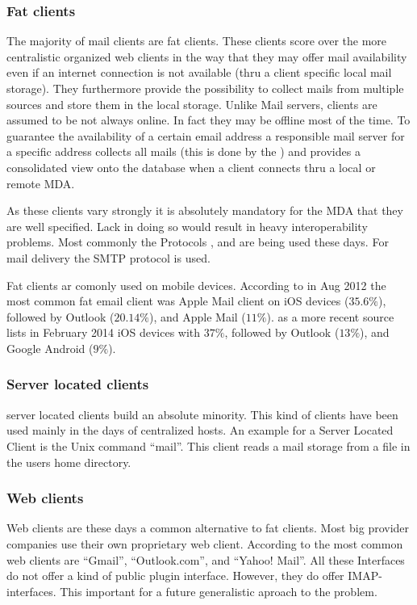 \subsubsection{Fat clients}
The majority of mail clients are fat clients. These clients score over the more centralistic organized web clients in the way that they may offer mail availability even if an internet connection is not available (thru a client specific local mail storage). They furthermore provide the possibility to collect mails from multiple sources and store them in the local storage. Unlike Mail servers, clients are assumed to be not always online. In fact they may be offline most of the time. To guarantee the availability of a certain email address a responsible mail server for a specific address collects all mails (this is done by the ) and provides a consolidated view onto the database when a client connects thru a local or remote MDA.\par

As these clients vary strongly it is absolutely mandatory for the MDA that they are well specified. Lack in doing so would result in heavy interoperability problems. Most commonly the Protocols ,  and  are being used these days. For mail delivery the SMTP protocol is used. \par

Fat clients ar comonly used on mobile devices. According to  \cite{clientDistribution} in Aug 2012 the most common fat email client was Apple Mail client on iOS devices ($35.6\%$), followed by Outlook ($20.14\%$), and Apple Mail ($11\%$). \cite{clientDistribution2} as a more recent source lists in February 2014 iOS devices with $37\%$, followed by Outlook ($13\%$), and  Google Android ($9\%$).

\subsubsection{Server located clients}
server located clients build an absolute minority. This kind of clients have been used mainly in the days of centralized hosts. An example for a Server Located Client is the Unix command "`mail"'. This client reads a mail storage from a file in the users home directory.

\subsubsection{Web clients}
Web clients are these days a common alternative to fat clients. Most big provider companies use their own proprietary web client. According to \cite{clientDistribution2} the most common web clients are "`Gmail"', "`Outlook.com"', and "`Yahoo! Mail"'. All these Interfaces do not offer a kind of public plugin interface. However,  they do offer IMAP-interfaces. This important for a future generalistic aproach to the problem.

